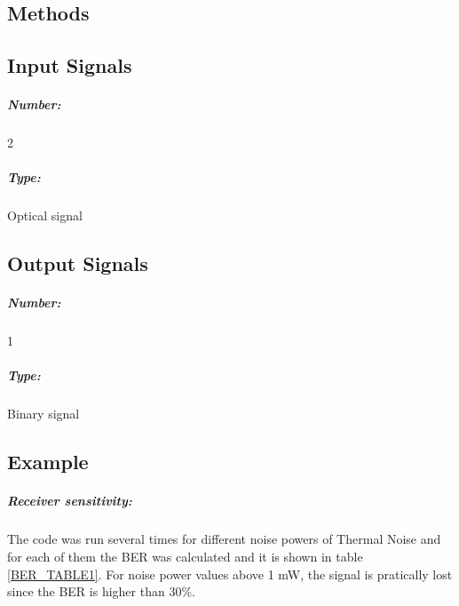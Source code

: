 \subsection*{Methods}

%

\subsection*{Input Signals}

\subparagraph*{Number:} 2

\subparagraph*{Type:} Optical signal

\subsection*{Output Signals}

\subparagraph*{Number:} 1

\subparagraph*{Type:} Binary signal

\subsection*{Example}

\subparagraph*{Receiver sensitivity:}

The code was run several times for different noise powers of Thermal Noise and for each of them the BER was calculated and it is shown in table \ref{BER_TABLE1}. For noise power values above 1 mW, the signal is pratically lost since the BER is higher than 30\%.

